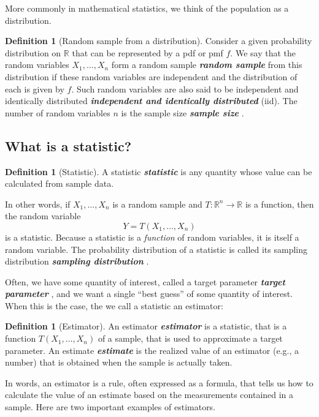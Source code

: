\documentclass[10pt]{article}
\theoremstyle{definition}
\newtheorem{definition}[theorem]{Definition}
\newcommand{\1}[1]{\textbf{1}_{\left[#1\right]}} %
\def\R{\mathbb{R}} %
\DeclareRobustCommand{\demph}[1]{%
  \ifmmode
  {\color{Blue}#1}%
  \else
  {\color{Blue}\bfseries\slshape #1}%
  \fi
}
\begin{document}
More commonly in mathematical statistics, we think of the population as a
distribution.

\begin{definition}[Random sample from a distribution]
  Consider a given probability distribution on $\R$ that can be represented by
  a pdf or pmf $f$. We say that the random variables $X_{1},\ldots,X_{n}$ form
  a \demph{random sample} from this distribution if these random variables are
  independent and the distribution of each is given by $f$. Such random
  variables are also said to be \demph{independent and identically
    distributed} (iid). The number of random variables $n$ is the
  \demph{sample size}.
\end{definition}


\subsection{What is a statistic?}
\begin{definition}[Statistic]
  A \demph{statistic} is any quantity whose value can be calculated from
  sample data.
\end{definition}

In other words, if $X_{1},\ldots,X_{n}$ is a random sample and
$T:\R^{n}\to \R$ is a function, then the random
variable
\begin{equation*}
  Y = T(X_{1},\ldots,X_{n})
\end{equation*}
is a statistic. Because a statistic is a \textit{function} of random
variables, it is itself a random variable. The probability distribution of a
statistic is called its \demph{sampling distribution}.

Often, we have some quantity of interest, called a \demph{target parameter},
and we want a single ``best guess'' of some quantity of interest. When this is
the case, the we call a statistic an estimator:

\begin{definition}[Estimator]
  \label{def:estimator}
  An \demph{estimator} is a statistic, that is a function
  $T(X_{1},\ldots,X_{n})$ of a sample, that is used to approximate a target
  parameter.
  An \demph{estimate} is the realized value of an
  estimator (e.g., a number) that is obtained when the sample is actually
  taken.
\end{definition}

In words, an estimator is a rule, often expressed as a formula, that tells us
how to calculate the value of an estimate based on the measurements contained
in a sample. Here are two important examples of estimators.
\end{document}
